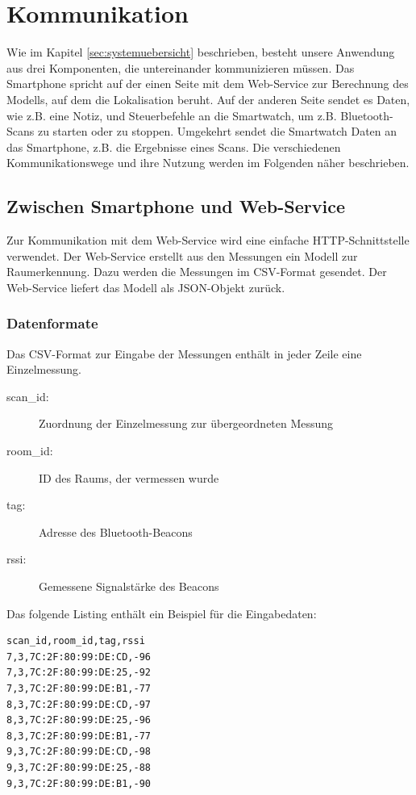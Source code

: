 \section{Kommunikation}
Wie im Kapitel \ref{sec:systemuebersicht} beschrieben, besteht unsere Anwendung aus drei Komponenten, die untereinander kommunizieren müssen. Das Smartphone spricht auf der einen Seite mit dem Web-Service zur Berechnung des Modells, auf dem die Lokalisation beruht. Auf der anderen Seite sendet es Daten, wie z.B. eine Notiz, und Steuerbefehle an die Smartwatch, um z.B. Bluetooth-Scans zu starten oder zu stoppen. Umgekehrt sendet die Smartwatch Daten an das Smartphone, z.B. die Ergebnisse eines Scans. Die verschiedenen Kommunikationswege und ihre Nutzung werden im Folgenden näher beschrieben.

\subsection{Zwischen Smartphone und Web-Service}

Zur Kommunikation mit dem Web-Service wird eine einfache HTTP-Schnittstelle verwendet.
Der Web-Service erstellt aus den Messungen ein Modell zur Raumerkennung. Dazu
werden die Messungen im CSV-Format gesendet. Der Web-Service liefert das Modell
als JSON-Objekt zurück.

\subsubsection{Datenformate}

Das CSV-Format zur Eingabe der Messungen enthält in jeder Zeile eine Einzelmessung.
\begin{description}
	\item[scan\_id:] Zuordnung der Einzelmessung zur übergeordneten Messung
	\item[room\_id:] ID des Raums, der vermessen wurde
	\item[tag:] Adresse des Bluetooth-Beacons
	\item[rssi:] Gemessene Signalstärke des Beacons
\end{description}

Das folgende Listing enthält ein Beispiel für die Eingabedaten:
\begin{lstlisting}
scan_id,room_id,tag,rssi
7,3,7C:2F:80:99:DE:CD,-96
7,3,7C:2F:80:99:DE:25,-92
7,3,7C:2F:80:99:DE:B1,-77
8,3,7C:2F:80:99:DE:CD,-97
8,3,7C:2F:80:99:DE:25,-96
8,3,7C:2F:80:99:DE:B1,-77
9,3,7C:2F:80:99:DE:CD,-98
9,3,7C:2F:80:99:DE:25,-88
9,3,7C:2F:80:99:DE:B1,-90
\end{lstlisting}


